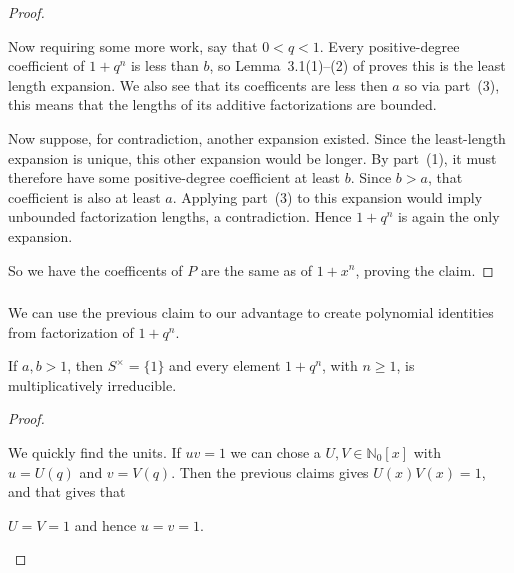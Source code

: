 \documentclass[11pt]{scrartcl}
\begin{document}
\begin{soln}
\begin{proof}
\begin{subproof}
    Now requiring some more work, say that $0<q<1$. Every positive-degree coefficient of
    $1+q^n$ is less than $b$, so Lemma~3.1(1)--(2) of
    \cite{p7-chapman-gotti-gotti} proves this is the least length expansion. 
    We also see that its coefficents are less then $a$ so via 
    part~(3), this means that the lengths of its additive
    factorizations are bounded.

    Now suppose, for contradiction,  another expansion existed. Since the
    least-length expansion is unique, this other expansion
    would be longer. By part~(1), it must therefore have
    some positive-degree coefficient at least $b$.
    Since $b>a$, that coefficient is also at least $a$.
    Applying part~(3) to this expansion would imply
    unbounded factorization lengths, a contradiction.
    Hence $1+q^n$ is again the only expansion.
\end{subproof}

        So we have the coefficents of $P$ are the same
		as of $1+x^n$, proving the claim.
    \end{proof}

    \subsubsection*{}

    We can use the previous claim to our advantage to create polynomial
	identities from factorization of $1+q^n$.

    \begin{claim*}
        If $a,b>1$, then $S^\times=\{1\}$ and every element
        $1+q^n$, with $n\ge1$, is multiplicatively irreducible.
    \end{claim*}

    \begin{proof}
        \begin{subproof}
			We quickly find the units. If $uv=1$ we can chose a $U,V\in\mathbb N_0[x]$
            with $u=U(q)$ and $v=V(q)$.
			Then the previous claims gives $U(x)V(x)=1$, and that gives that

            $U=V=1$ and hence $u=v=1$.
        \end{subproof}


\end{proof}
\end{soln}
\end{document}
